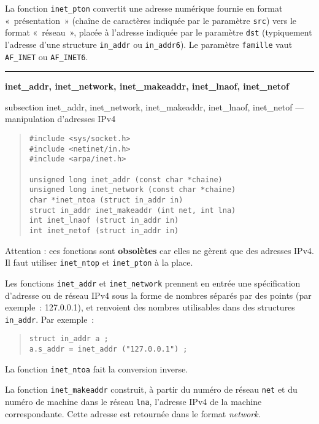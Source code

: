 \documentclass [twoside] {report}
\newcommand {\primitive} [1]
    {
	\phantomsection
	{\large \bf #1}
	\addcontentsline {toc} {subsection} {#1}
    }
\newcommand {\separation}
    {
	\vspace {5mm}
	\nopagebreak
	\hrule
    }
\begin{document}
La fonction \texttt {inet\_pton} convertit une adresse numérique
fournie en format «~présentation~» (chaîne de caractères indiquée
par le paramètre \texttt {src}) vers le format «~réseau~», placée
à l'adresse indiquée par le paramètre \texttt {dst} (typiquement
l'adresse d'une structure \texttt {in\_addr} ou \texttt {in\_addr6}).
Le paramètre \texttt {famille} vaut \texttt {AF\_INET} ou \texttt
{AF\_INET6}.


\separation
\primitive {inet\_addr, inet\_network, inet\_makeaddr, inet\_lnaof,
inet\_netof} --- manipulation d'adresses IPv4

\begin {quote}
\begin {verbatim}
#include <sys/socket.h>
#include <netinet/in.h>
#include <arpa/inet.h>

unsigned long inet_addr (const char *chaine)
unsigned long inet_network (const char *chaine)
char *inet_ntoa (struct in_addr in)
struct in_addr inet_makeaddr (int net, int lna)
int inet_lnaof (struct in_addr in)
int inet_netof (struct in_addr in)
\end{verbatim}
\end {quote}

Attention : ces fonctions sont \textbf {obsolètes} car elles ne gèrent que
des adresses IPv4. Il faut utiliser \texttt {inet\_ntop} et \texttt
{inet\_pton} à la place.

Les fonctions {\tt inet\_addr} et {\tt inet\_network} prennent en entrée
une spécification d'adresse ou de réseau IPv4 sous la forme de nombres
séparés par des points (par exemple~: 127.0.0.1), et renvoient des
nombres utilisables dans des structures {\tt in\_addr}. Par exemple~:

\begin {quote}
\begin {verbatim}
struct in_addr a ;
a.s_addr = inet_addr ("127.0.0.1") ;
\end{verbatim}
\end {quote}

La fonction {\tt inet\_ntoa} fait la conversion inverse.

La fonction {\tt inet\_makeaddr} construit, à partir du numéro de réseau
{\tt net} et du numéro de machine dans le réseau {\tt lna}, l'adresse IPv4
de la machine correspondante. Cette adresse est retournée dans le format
{\em network}.
\end{document}
